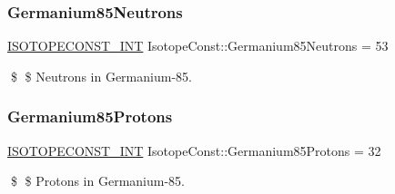 \subsubsection{\texorpdfstring{Germanium85\+Neutrons}{Germanium85Neutrons}}
{\footnotesize\ttfamily \mbox{\hyperlink{group___isotope_const-_macros_ga5f18360b3e99483a35c32d789e62621c}{I\+S\+O\+T\+O\+P\+E\+C\+O\+N\+S\+T\+\_\+\+I\+NT}} Isotope\+Const\+::\+Germanium85\+Neutrons = 53}

\$ \$ Neutrons in Germanium-\/85. \mbox{\label{group___isotope_const-_germanium-_ge85_ga4c204d4fe5addba7b4dee35585383162}} 
\subsubsection{\texorpdfstring{Germanium85\+Protons}{Germanium85Protons}}
{\footnotesize\ttfamily \mbox{\hyperlink{group___isotope_const-_macros_ga5f18360b3e99483a35c32d789e62621c}{I\+S\+O\+T\+O\+P\+E\+C\+O\+N\+S\+T\+\_\+\+I\+NT}} Isotope\+Const\+::\+Germanium85\+Protons = 32}

\$ \$ Protons in Germanium-\/85. 